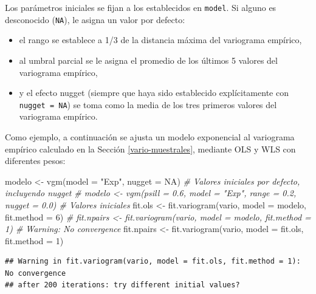 \documentclass[
  spanish,
]{book}
\newenvironment{Shaded}{\begin{snugshade}}{\end{snugshade}}
\newcommand{\AttributeTok}[1]{\textcolor[rgb]{0.77,0.63,0.00}{#1}}
\newcommand{\CommentTok}[1]{\textcolor[rgb]{0.56,0.35,0.01}{\textit{#1}}}
\newcommand{\ConstantTok}[1]{\textcolor[rgb]{0.00,0.00,0.00}{#1}}
\newcommand{\DecValTok}[1]{\textcolor[rgb]{0.00,0.00,0.81}{#1}}
\newcommand{\FunctionTok}[1]{\textcolor[rgb]{0.00,0.00,0.00}{#1}}
\newcommand{\NormalTok}[1]{#1}
\newcommand{\OtherTok}[1]{\textcolor[rgb]{0.56,0.35,0.01}{#1}}
\newcommand{\StringTok}[1]{\textcolor[rgb]{0.31,0.60,0.02}{#1}}
\providecommand{\tightlist}{%
  \setlength{\itemsep}{0pt}\setlength{\parskip}{0pt}}
\theoremstyle{break}
\theoremstyle{definition}
\theoremstyle{definition}
\theoremstyle{definition}
\theoremstyle{definition}
\theoremstyle{remark}
\begin{document}
Los parámetros iniciales se fijan a los establecidos en \texttt{model}. Si alguno es desconocido (\texttt{NA}), le asigna un valor por defecto:

\begin{itemize}
\tightlist
\item
  el rango se establece a 1/3 de la distancia máxima del variograma empírico,
\item
  al umbral parcial se le asigna el promedio de los últimos 5 valores del variograma empírico,
\item
  y el efecto nugget (siempre que haya sido establecido explícitamente con \texttt{nugget\ =\ NA}) se toma como la media de los tres primeros valores del variograma empírico.
\end{itemize}

Como ejemplo, a continuación se ajusta un modelo exponencial al variograma empírico calculado en la Sección \ref{vario-muestrales}, mediante OLS y WLS con diferentes pesos:

\begin{Shaded}
\begin{Highlighting}[]
\NormalTok{modelo }\OtherTok{\textless{}{-}} \FunctionTok{vgm}\NormalTok{(}\AttributeTok{model =} \StringTok{"Exp"}\NormalTok{, }\AttributeTok{nugget =} \ConstantTok{NA}\NormalTok{) }\CommentTok{\# Valores iniciales por defecto, incluyendo nugget}
\CommentTok{\# modelo \textless{}{-} vgm(psill = 0.6, model = "Exp", range = 0.2, nugget = 0.0) \# Valores iniciales}
\NormalTok{fit.ols }\OtherTok{\textless{}{-}} \FunctionTok{fit.variogram}\NormalTok{(vario, }\AttributeTok{model =}\NormalTok{ modelo, }\AttributeTok{fit.method =} \DecValTok{6}\NormalTok{)}
\CommentTok{\# fit.npairs \textless{}{-} fit.variogram(vario, model = modelo, fit.method = 1) \# Warning: No convergence}
\NormalTok{fit.npairs }\OtherTok{\textless{}{-}} \FunctionTok{fit.variogram}\NormalTok{(vario, }\AttributeTok{model =}\NormalTok{ fit.ols, }\AttributeTok{fit.method =} \DecValTok{1}\NormalTok{)}
\end{Highlighting}
\end{Shaded}

\begin{verbatim}
## Warning in fit.variogram(vario, model = fit.ols, fit.method = 1): No convergence
## after 200 iterations: try different initial values?
\end{verbatim}
\end{document}
